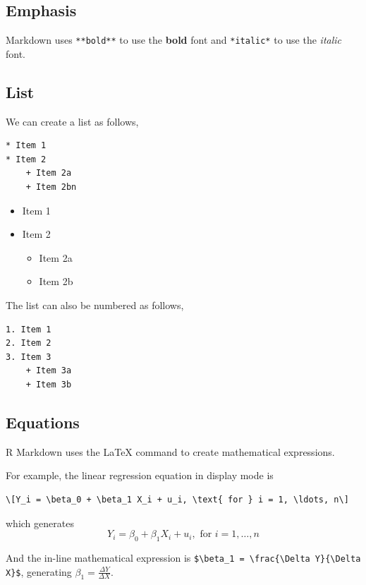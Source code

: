 \documentclass[11pt]{article}
\begin{document}
\subsection*{Emphasis}
\label{sec:orgbf07f77}

Markdown uses \texttt{**bold**} to use the \textbf{bold} font and \texttt{*italic*} to use
the \emph{italic} font.

\subsection*{List}
\label{sec:org20d9470}

We can create a list as follows,

\begin{verbatim}
* Item 1
* Item 2
    + Item 2a
    + Item 2bn
\end{verbatim}

\begin{itemize}
\item Item 1
\item Item 2

\begin{itemize}
\item Item 2a
\item Item 2b
\end{itemize}
\end{itemize}

The list can also be numbered as follows,

\begin{verbatim}
1. Item 1
2. Item 2
3. Item 3
    + Item 3a
    + Item 3b
\end{verbatim}

\subsection*{Equations}
\label{sec:orgbb1b400}

R Markdown uses the \LaTeX{} command to create mathematical expressions.

For example, the linear regression equation in display mode is

\begin{verbatim}
\[Y_i = \beta_0 + \beta_1 X_i + u_i, \text{ for } i = 1, \ldots, n\]
\end{verbatim}

which generates
$$Y_i = \beta_0 + \beta_1 X_i + u_i, \text{ for } i = 1, \ldots, n$$

And the in-line mathematical expression is
\texttt{\$\textbackslash{}beta\_1 = \textbackslash{}frac\{\textbackslash{}Delta Y\}\{\textbackslash{}Delta X\}\$}, generating
\(\beta_1 = \frac{\Delta Y}{\Delta X}\).
\end{document}

